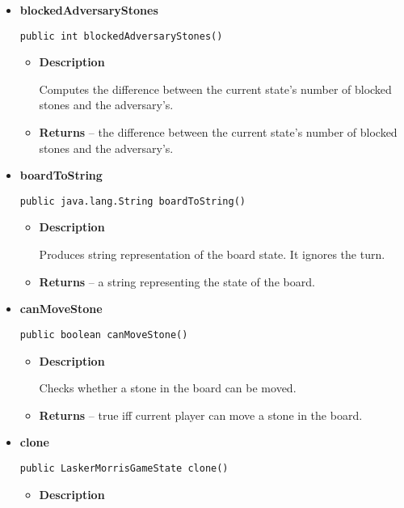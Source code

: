 \documentclass[11pt,a4paper]{report}
\begin{document}
{{{{{{{{{{{\begin{itemize}
{\begin{itemize}
{Indicates whether black won in current state.
}
\item{{\bf  Returns} -- 
true iff state is final and black wins. 
}%
\end{itemize}
}%
\item{ 
{\bf  blockedAdversaryStones}\\
\begin{lstlisting}[frame=none]
public int blockedAdversaryStones()\end{lstlisting} %
\begin{itemize}
\item{
{\bf  Description}

Computes the difference between the current state's number of blocked stones and the adversary's.
}
\item{{\bf  Returns} -- 
the difference between the current state's number of blocked stones and the adversary's. 
}%
\end{itemize}
}%
\item{ 
{\bf  boardToString}\\
\begin{lstlisting}[frame=none]
public java.lang.String boardToString()\end{lstlisting} %
\begin{itemize}
\item{
{\bf  Description}

Produces string representation of the board state. It ignores the turn.
}
\item{{\bf  Returns} -- 
a string representing the state of the board. 
}%
\end{itemize}
}%
\item{ 
{\bf  canMoveStone}\\
\begin{lstlisting}[frame=none]
public boolean canMoveStone()\end{lstlisting} %
\begin{itemize}
\item{
{\bf  Description}

Checks whether a stone in the board can be moved.
}
\item{{\bf  Returns} -- 
true iff current player can move a stone in the board. 
}%
\end{itemize}
}%
\item{ 
{\bf  clone}\\
\begin{lstlisting}[frame=none]
public LaskerMorrisGameState clone()\end{lstlisting} %
\begin{itemize}
\item{
{\bf  Description}

}
\end{itemize}}
\end{itemize}}}}}}}}}}}}
\end{document}
